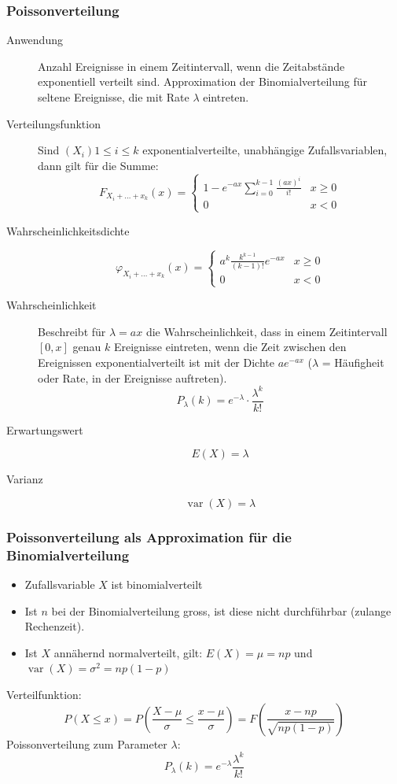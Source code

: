 \subsubsection{Poissonverteilung}
\begin{description}
  \item[Anwendung] Anzahl Ereignisse in einem Zeitintervall, wenn die
    Zeitabstände exponentiell verteilt sind. Approximation der
    Binomialverteilung für seltene Ereignisse, die mit Rate $\lambda$
    eintreten.
  \item[Verteilungsfunktion] Sind $(X_i)1 \leq i \leq k$
    exponentialverteilte, unabhängige Zufallsvariablen, dann gilt für die
    Summe:
  \[F_{X_i+\dots+x_k}(x) = \begin{cases}1 - e^{-ax} \sum_{i=0}^{k-1}
  \frac{(ax)^i}{i!} & x \geq 0 \\ 0 & x < 0\end{cases}\]
  \item[Wahrscheinlichkeitsdichte]
  \[\varphi_{X_i+\dots+x_k}(x) = \begin{cases}a^k \frac{k^{k-1}}{(k-1)!}
  e^{-ax} & x \geq 0 \\ 0 & x < 0\end{cases}\]
  \item[Wahrscheinlichkeit] Beschreibt für $\lambda = ax$ die
    Wahrscheinlichkeit, dass in einem Zeitintervall $[0, x]$ genau $k$
    Ereignisse eintreten, wenn die Zeit zwischen den Ereignissen
    exponentialverteilt ist mit der Dichte $ae^{-ax}$ ($\lambda$ =
    Häufigheit oder Rate, in der Ereignisse auftreten).
    \[P_\lambda(k) = e^{-\lambda} \cdot \frac{\lambda^k}{k!}\]
  \item[Erwartungswert] \[E(X) = \lambda\]
  \item[Varianz] \[\operatorname{var}(X) = \lambda\]
\end{description}

\subsubsection{Poissonverteilung als Approximation für die
Binomialverteilung}
\begin{itemize}
  \item Zufallsvariable $X$ ist binomialverteilt
  \item Ist $n$ bei der Binomialverteilung gross, ist diese nicht
    durchführbar (zulange Rechenzeit).
  \item Ist $X$ annähernd normalverteilt, gilt:
    $E(X) = \mu = np$ und $\operatorname{var}(X) = \sigma^2 = np(1-p)$
\end{itemize}
Verteilfunktion:
\[ P(X \le x) = P\left(\frac{X - \mu}{\sigma} \le
  \frac{x-\mu}{\sigma}\right) = F\left(\frac{x-np}{\sqrt{np(1-p)}}\right)\]
Poissonverteilung zum Parameter $\lambda$:
\[ P_{\lambda}(k) = e^{-\lambda} \frac{\lambda^k}{k!}\]

